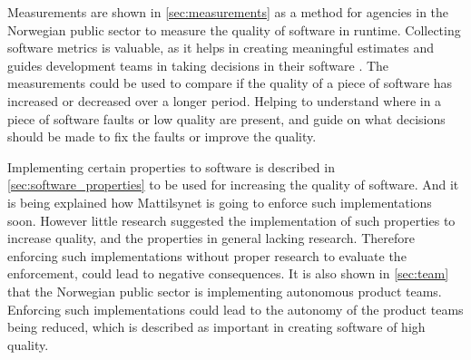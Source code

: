 
Measurements are shown in \autoref{sec:measurements} as a method for agencies in the Norwegian public sector to measure the quality of software in runtime. Collecting software metrics is valuable, as it helps in creating meaningful estimates and guides development teams in taking decisions in their software \cite{jkc_2010}. The measurements could be used to compare if the quality of a piece of software has increased or decreased over a longer period. Helping to understand where in a piece of software faults or low quality are present, and guide on what decisions should be made to fix the faults or improve the quality.


Implementing certain properties to software is described in \autoref{sec:software_properties} to be used for increasing the quality of software. And it is being explained how Mattilsynet is going to enforce such implementations soon. However little research suggested the implementation of such properties to increase quality, and the properties in general lacking research. Therefore enforcing such implementations without proper research to evaluate the enforcement, could lead to negative consequences. It is also shown in \autoref{sec:team} that the Norwegian public sector is implementing autonomous product teams. Enforcing such implementations could lead to the autonomy of the product teams being reduced, which is described as important in creating software of high quality.

